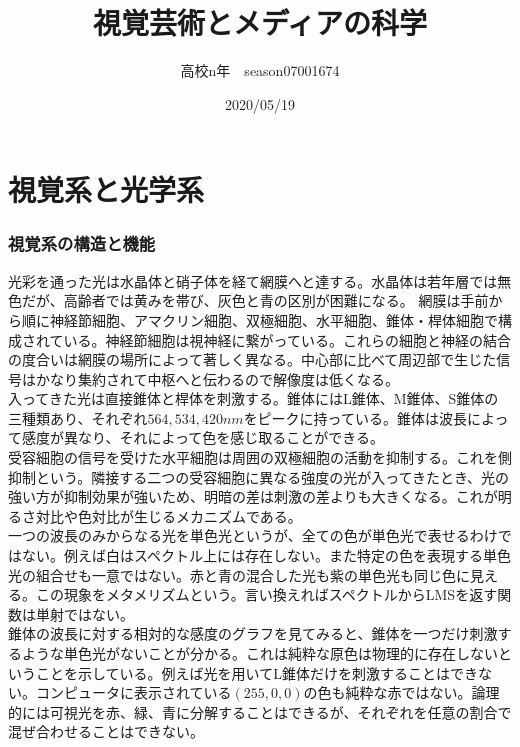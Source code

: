 \documentclass{jsarticle}
\begin{document}
\title{視覚芸術とメディアの科学}
\author{高校n年　season07001674}
\date{2020/05/19}
\maketitle
\newcommand{\repart}[1]{\part{#1}\setcounter{section}{0}}
\newcommand{\lr}[1]{\left(#1 \right)}
\newcommand{\mlr}[1]{\left\{#1 \right\}}
\newcommand{\llr}[1]{\left[#1 \right]}
\newcommand{\rec}[1]{\frac{1}{#1}}
\newcommand{\de}[2][]{\frac{d #1}{d #2}}
\newcommand{\dd}[2][]{\frac{d^2 #1}{d #2^2}}
\newcommand{\pd}[2][]{\frac{\partial #1}{\partial #2}}
\newcommand{\ppd}[3]{\frac{\partial^2 #1}{\partial #2\partial #3}}
\newcommand{\pmat}[1]{\begin{pmatrix} #1 \end{pmatrix}}
\newcommand{\co}[1][]{\cos^{#1}\theta}
\newcommand{\si}[1][]{\sin^{#1}\theta}
\newcommand{\grad}{\mathrm{grad}}
\newcommand{\dive}{\mathrm{div}}
\newcommand{\rot}{\mathrm{rot}}
\newcommand{\pa}{\partial}
\newcommand{\na}{\nabla}

\repart{視覚系と光学系}
	\section{視覚系の構造と機能}
		光彩を通った光は水晶体と硝子体を経て網膜へと達する。水晶体は若年層では無色だが、高齢者では黄みを帯び、灰色と青の区別が困難になる。
		網膜は手前から順に神経節細胞、アマクリン細胞、双極細胞、水平細胞、錐体・桿体細胞で構成されている。神経節細胞は視神経に繋がっている。これらの細胞と神経の結合の度合いは網膜の場所によって著しく異なる。中心部に比べて周辺部で生じた信号はかなり集約されて中枢へと伝わるので解像度は低くなる。\\
		入ってきた光は直接錐体と桿体を刺激する。錐体にはL錐体、M錐体、S錐体の三種類あり、それぞれ$564, 534, 420nm$をピークに持っている。錐体は波長によって感度が異なり、それによって色を感じ取ることができる。\\
		受容細胞の信号を受けた水平細胞は周囲の双極細胞の活動を抑制する。これを側抑制という。隣接する二つの受容細胞に異なる強度の光が入ってきたとき、光の強い方が抑制効果が強いため、明暗の差は刺激の差よりも大きくなる。これが明るさ対比や色対比が生じるメカニズムである。\\
		一つの波長のみからなる光を単色光というが、全ての色が単色光で表せるわけではない。例えば白はスペクトル上には存在しない。また特定の色を表現する単色光の組合せも一意ではない。赤と青の混合した光も紫の単色光も同じ色に見える。この現象をメタメリズムという。言い換えればスペクトルからLMSを返す関数は単射ではない。\\
		錐体の波長に対する相対的な感度のグラフを見てみると、錐体を一つだけ刺激するような単色光がないことが分かる。これは純粋な原色は物理的に存在しないということを示している。例えば光を用いてL錐体だけを刺激することはできない。コンピュータに表示されている$(255, 0, 0)$の色も純粋な赤ではない。論理的には可視光を赤、緑、青に分解することはできるが、それぞれを任意の割合で混ぜ合わせることはできない。\\
\end{document}
